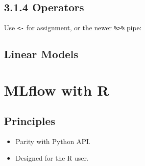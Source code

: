 \documentclass[]{article}
\newenvironment{Shaded}{\begin{snugshade}}{\end{snugshade}}
\newcommand{\DataTypeTok}[1]{\textcolor[rgb]{0.13,0.29,0.53}{#1}}
\newcommand{\DecValTok}[1]{\textcolor[rgb]{0.00,0.00,0.81}{#1}}
\newcommand{\KeywordTok}[1]{\textcolor[rgb]{0.13,0.29,0.53}{\textbf{#1}}}
\newcommand{\NormalTok}[1]{#1}
\newcommand{\OperatorTok}[1]{\textcolor[rgb]{0.81,0.36,0.00}{\textbf{#1}}}
\newcommand{\StringTok}[1]{\textcolor[rgb]{0.31,0.60,0.02}{#1}}
\providecommand{\tightlist}{%
  \setlength{\itemsep}{0pt}\setlength{\parskip}{0pt}}
\begin{document}
\hypertarget{operators}{%
\subsection{3.1.4 Operators}\label{operators}}

Use \texttt{\textless{}-} for assignment, or the newer
\texttt{\%\textgreater{}\%} pipe:

\begin{Shaded}
\end{Shaded}

\hypertarget{linear-models}{%
\subsection{Linear Models}\label{linear-models}}

\begin{Shaded}
\end{Shaded}

\hypertarget{mlflow-with-r}{%
\section{MLflow with R}\label{mlflow-with-r}}

\hypertarget{principles}{%
\subsection{Principles}\label{principles}}

\begin{itemize}
\tightlist
\item
  Parity with Python API.
\item
  Designed for the R user.
\end{itemize}
\end{document}
